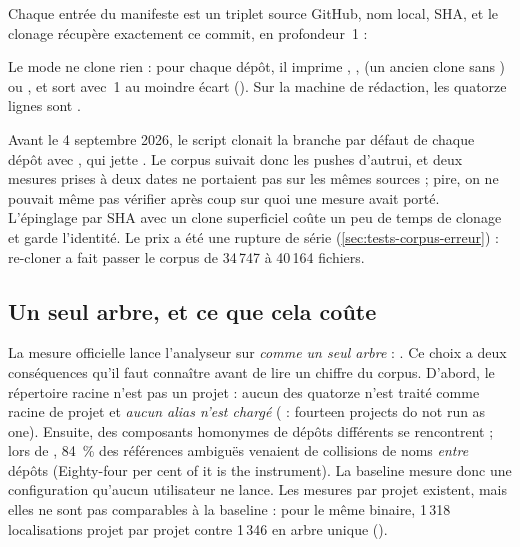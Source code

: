 
Chaque entrée du manifeste est un triplet \og source GitHub, nom local, SHA\fg{}, et le clonage récupère exactement ce commit, en profondeur~1 :


Le mode  ne clone rien : pour chaque dépôt, il imprime , ,  (un ancien clone sans ) ou , et sort avec~1 au moindre écart (). Sur la machine de rédaction, les quatorze lignes sont .

\begin{decision}
Avant le 4 septembre 2026, le script clonait la branche par défaut de chaque dépôt avec , qui jette . Le corpus suivait donc les pushes d'autrui, et deux mesures prises à deux dates ne portaient pas sur les mêmes sources ; pire, on ne pouvait même pas vérifier après coup sur quoi une mesure avait porté. L'épinglage par SHA avec un clone superficiel coûte un peu de temps de clonage et garde l'identité. Le prix a été une rupture de série (\cref{sec:tests-corpus-erreur}) : re-cloner a fait passer le corpus de 34\,747 à 40\,164 fichiers.
\end{decision}

\subsection{Un seul arbre, et ce que cela coûte}

La mesure officielle lance l'analyseur sur  \emph{comme un seul arbre} : . Ce choix a deux conséquences qu'il faut connaître avant de lire un chiffre du corpus. D'abord, le répertoire racine n'est pas un projet : aucun des quatorze  n'est traité comme racine de projet et \emph{aucun alias n'est chargé} ( : \og fourteen projects do not run as one\fg{}). Ensuite, des composants homonymes de dépôts différents se rencontrent ; lors de , 84~\% des références ambiguës venaient de collisions de noms \emph{entre} dépôts (\og Eighty-four per cent of it is the instrument\fg{}). La baseline mesure donc une configuration qu'aucun utilisateur ne lance. Les mesures \og par projet\fg{} existent, mais elles ne sont pas comparables à la baseline : pour le même binaire, 1\,318 localisations projet par projet contre 1\,346 en arbre unique ().

